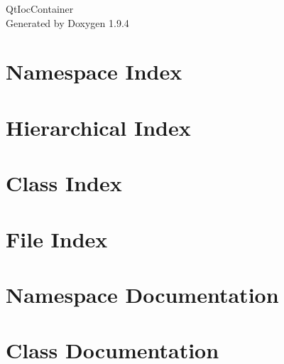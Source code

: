 \documentclass[twoside]{book}
\newcommand{\+}{\discretionary{\mbox{\scriptsize$\hookleftarrow$}}{}{}}
\newcommand{\clearemptydoublepage}{%
    \newpage{\pagestyle{empty}\cleardoublepage}%
  }
\begin{document}
  \raggedbottom
    \hypersetup{pageanchor=false,
                bookmarksnumbered=true,
                pdfencoding=unicode
               }
  \begin{titlepage}
  \vspace*{7cm}
  \begin{center}%
  {\Large Qt\+Ioc\+Container}\\
  \vspace*{1cm}
  {\large Generated by Doxygen 1.9.4}\\
  \end{center}
  \end{titlepage}
  \clearemptydoublepage
  \tableofcontents
  \clearemptydoublepage
  \hypersetup{pageanchor=true}
\chapter{Namespace Index}

\chapter{Hierarchical Index}

\chapter{Class Index}

\chapter{File Index}

\chapter{Namespace Documentation}

\chapter{Class Documentation}














\end{document}
